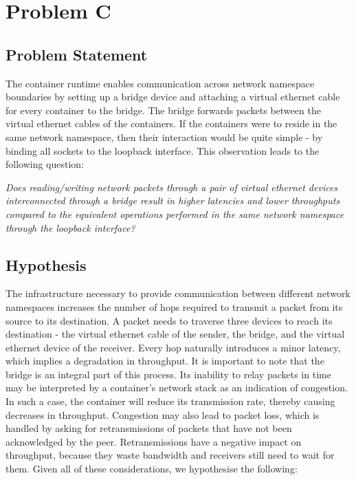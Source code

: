 

\section{Problem C}

\subsection{Problem Statement}
The container runtime enables communication across network namespace boundaries 
by setting up a bridge device and attaching a virtual ethernet cable for every container to the bridge.
The bridge forwards packets between the virtual ethernet cables of the containers.
If the containers were to reside in the same network namespace, then their interaction would be 
quite simple - by binding all sockets to the loopback interface. 
This observation leads to the following question:

\textit{Does reading/writing network packets through a pair of virtual ethernet 
devices interconnected through a bridge result in higher latencies and lower throughputs 
compared to the equivalent operations performed in the same network namespace through the loopback interface?}

\subsection{Hypothesis}
The infrastructure necessary to provide communication between different network namespaces 
increases the number of hops required to transmit a packet from its source to its destination. 
A packet needs to traverse three devices to reach its destination - the virtual ethernet 
cable of the sender, the bridge, and the virtual ethernet device of the receiver. 
Every hop naturally introduces a minor latency, which implies a degradation in throughput.
It is important to note that the bridge is an integral part of this process. 
Its inability to relay packets in time may be interpreted by a container's network stack 
as an indication of congestion. In such a case, the container will reduce 
its transmission rate, thereby causing decreases in throughput. Congestion may also lead 
to packet loss, which is handled by asking for retransmissions of packets that have not been 
acknowledged by the peer. Retransmissions have a negative impact on throughput, because they 
waste bandwidth and receivers still need to wait for them. Given all of these considerations,
we hypothesise the following:

